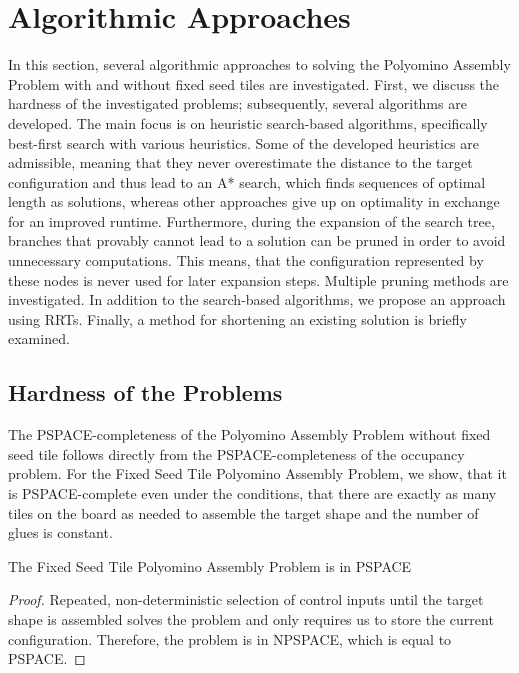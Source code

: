 \chapter{Algorithmic Approaches}

In this section, several algorithmic approaches to solving the Polyomino Assembly Problem with and without fixed seed tiles are investigated. First, we discuss the hardness of the investigated problems; subsequently, several algorithms are developed. The main focus is on heuristic search-based algorithms, specifically best-first search with various heuristics. Some of the developed heuristics are admissible, meaning that they never overestimate the distance to the target configuration and thus lead to an A* search, which finds sequences of optimal length as solutions, whereas other approaches give up on optimality in exchange for an improved runtime. Furthermore, during the expansion of the search tree, branches that provably cannot lead to a solution can be pruned in order to avoid unnecessary computations. This means, that the configuration represented by these nodes is never used for later expansion steps. Multiple pruning methods are investigated. In addition to the search-based algorithms, we propose an approach using RRTs. Finally, a method for shortening an existing solution is briefly examined.


\section{Hardness of the Problems}
The PSPACE-completeness of the Polyomino Assembly Problem without fixed seed tile follows directly from the PSPACE-completeness of the occupancy problem. For the Fixed Seed Tile Polyomino Assembly Problem, we show, that it is PSPACE-complete even under the conditions, that there are exactly as many tiles on the board as needed to assemble the target shape and the number of glues is constant.

\begin{theorem}
The Fixed Seed Tile Polyomino Assembly Problem is in PSPACE
\end{theorem}

\begin{proof}
Repeated, non-deterministic selection of control inputs until the target shape is assembled solves the problem and only requires us to store the current configuration. Therefore, the problem is in NPSPACE, which is equal to PSPACE.
\end{proof}

